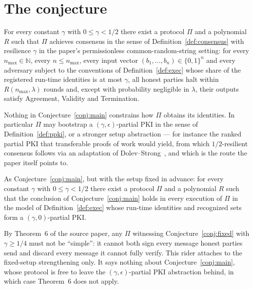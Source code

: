 \documentclass{conjura-conjecture}
\begin{document}
\section{The conjecture}\label{sec:conjectures}

\begin{conjecture}\label{conj:main}
For every constant $\gamma$ with $0 \le \gamma < 1/2$ there exist a
protocol $\Pi$ and a polynomial $R$ such that $\Pi$ achieves consensus
in the sense of Definition~\ref{def:consensus} with resilience $\gamma$
in the paper's permissionless common-random-string setting: for every
$n_{\max} \in \mathbb{N}$, every $n \le n_{\max}$, every input vector
$(b_1,\dots,b_n) \in \{0,1\}^{n}$ and every adversary subject to the
conventions of Definition~\ref{def:exec} whose share of the registered
run-time identities is at most $\gamma$, all honest parties halt within
$R(n_{\max},\lambda)$ rounds and, except with probability negligible in
$\lambda$, their outputs satisfy Agreement, Validity and Termination.
\end{conjecture}

Nothing in Conjecture~\ref{conj:main} constrains how $\Pi$ obtains its
identities. In particular $\Pi$ may bootstrap a
$(\gamma,\epsilon)$-partial PKI in the sense of
Definition~\ref{def:ppki}, or a stronger setup abstraction --- for
instance the ranked partial PKI that transferable proofs of work would
yield, from which $1/2$-resilient consensus follows via an adaptation of
Dolev--Strong~\cite{DS83}, and which is the route the paper itself
points to.

\begin{conjecture}\label{conj:fixed}
As Conjecture~\ref{conj:main}, but with the setup fixed in advance: for
every constant $\gamma$ with $0 \le \gamma < 1/2$ there exist a protocol
$\Pi$ and a polynomial $R$ such that the conclusion of
Conjecture~\ref{conj:main} holds in every execution of $\Pi$ in the
model of Definition~\ref{def:exec} whose run-time identities and
recognized sets form a $(\gamma,0)$-partial PKI.
\end{conjecture}

\begin{remark}
By Theorem~6 of the source paper, any $\Pi$ witnessing
Conjecture~\ref{conj:fixed} with $\gamma \ge 1/4$ must not be
``simple'': it cannot both sign every message honest parties send and
discard every message it cannot fully verify. This rider attaches to the
fixed-setup strengthening only. It says nothing about
Conjecture~\ref{conj:main}, whose protocol is free to leave the
$(\gamma,\epsilon)$-partial PKI abstraction behind, in which case
Theorem~6 does not apply.
\end{remark}
\end{document}
